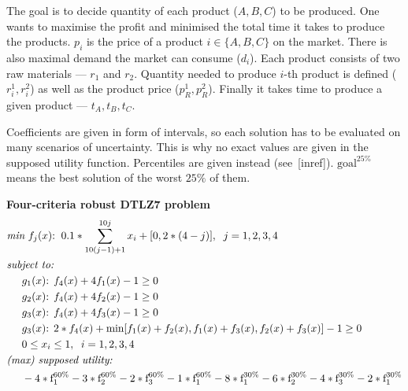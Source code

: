 \begin{description}
    The goal is to decide quantity of each product ($A, B, C$) to be
    produced. One wants to maximise the profit and minimised the total time it
    takes to produce the products. $p_i$ is the price of a product $i \in \{A,
    B, C\}$ on the market. There is also maximal demand the market can consume
    ($d_i$). Each product consists of two raw materials --- $r_1$ and
    $r_2$. Quantity needed to produce $i$-th product is defined ($r^1_i,
    r^2_i$) as well as the product price ($p^1_R, p^2_R$). Finally it takes
    time to produce a given product --- $t_A, t_B, t_C$.

    Coefficients are given in form of intervals, so each solution has to be
    evaluated on many scenarios of uncertainty. This is why no exact values
    are given in the supposed utility function. Percentiles are given instead
    (see~[inref]). $\text{goal}^{25\%}$ means the best solution of the worst
    $25\%$ of them.

  \item{\textbf{Four-criteria robust DTLZ7 problem}}
    \begin{align*}
      & \textit{min}\text{ $f_j(x)$:} \hspace{0.2cm}
      0.1 * \sum_{10(j-1) + 1}^{10j}x_i + [0, 2*(4-j)], \hspace{0.2cm}
      j = 1, 2, 3, 4\\
      & \textit{subject to:} \\
      & \hspace{0.5cm} g_1(x)\text{: } f_4(x) + 4f_1(x) - 1 \ge 0\\
      & \hspace{0.5cm} g_2(x)\text{: } f_4(x) + 4f_2(x) - 1 \ge 0\\
      & \hspace{0.5cm} g_3(x)\text{: } f_4(x) + 4f_3(x) - 1 \ge 0\\
      & \hspace{0.5cm} g_3(x)\text{: } 2*f_4(x) + \text{min}
      [f_1(x) + f_2(x), f_1(x) + f_3(x), f_2(x) + f_3(x)] -1 \ge 0\\
      & \hspace{0.5cm} 0 \le x_i \le 1, \hspace{0.2cm} i = 1, 2, 3, 4 \\
      & \textit{(max) supposed utility:} \\
      & \hspace{0.5cm} -4 * \text{f}_1^{60\%} -3 * \text{f}_2^{60\%}
      -2 * \text{f}_3^{60\%} -1 * \text{f}_1^{60\%}
      -8 * \text{f}_1^{30\%} -6 * \text{f}_2^{30\%}
      -4 * \text{f}_3^{30\%} -2 * \text{f}_1^{30\%}
    \end{align*}


\end{description}

